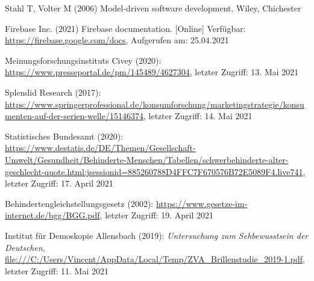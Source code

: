 \documentclass[11pt,a4paper]{article}
\begin{document}
\begin{itemize}
	 Stahl T, Volter M (2006) Model-driven software development. Wiley, Chichester

	 Firebase Inc. (2021) Firebase documentation. [Online] Verfügbar: \url{https://firebase.google.com/docs}, Aufgerufen am: 25.04.2021

     Meinungsforschungsinstituts Civey (2020):  \url{https://www.presseportal.de/pm/145489/4627304}, letzter Zugriff: 13. Mai 2021

     Splendid Research (2017): \url{https://www.springerprofessional.de/konsumforschung/marketingstrategie/konsumenten-auf-der-serien-welle/15146374}, letzter Zugriff: 14. Mai 2021

     Statistisches Bundesamt (2020): \url{https://www.destatis.de/DE/Themen/Gesellschaft-Umwelt/Gesundheit/Behinderte-Menschen/Tabellen/schwerbehinderte-alter-geschlecht-quote.html;jsessionid=885260788D4FFC7F670576B72E5089F4.live741}, letzter Zugriff: 17. April 2021

     Behindertengleichstellungsgesetz (2002): \url{https://www.gesetze-im-internet.de/bgg/BGG.pdf}, letzter Zugriff: 19. April 2021

     Institut für Demoskopie Allensbach (2019): \textit{Untersuchung zum Sehbewusstsein der Deutschen},  \url{file:///C:/Users/Vincent/AppData/Local/Temp/ZVA_Brillenstudie_2019-1.pdf}, letzter Zugriff: 11. Mai 2021
\end{itemize}
\end{document}
